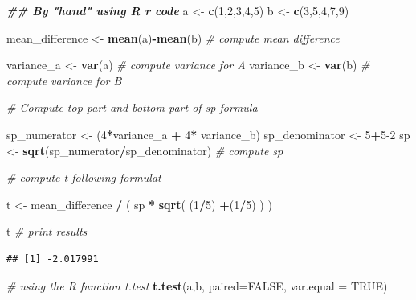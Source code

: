 \documentclass[
]{book}
\newenvironment{Shaded}{\begin{snugshade}}{\end{snugshade}}
\newcommand{\AttributeTok}[1]{\textcolor[rgb]{0.13,0.29,0.53}{#1}}
\newcommand{\CommentTok}[1]{\textcolor[rgb]{0.56,0.35,0.01}{\textit{#1}}}
\newcommand{\ConstantTok}[1]{\textcolor[rgb]{0.56,0.35,0.01}{#1}}
\newcommand{\DecValTok}[1]{\textcolor[rgb]{0.00,0.00,0.81}{#1}}
\newcommand{\DocumentationTok}[1]{\textcolor[rgb]{0.56,0.35,0.01}{\textbf{\textit{#1}}}}
\newcommand{\FunctionTok}[1]{\textcolor[rgb]{0.13,0.29,0.53}{\textbf{#1}}}
\newcommand{\NormalTok}[1]{#1}
\newcommand{\OtherTok}[1]{\textcolor[rgb]{0.56,0.35,0.01}{#1}}
\newcommand{\SpecialCharTok}[1]{\textcolor[rgb]{0.81,0.36,0.00}{\textbf{#1}}}
\begin{document}
\begin{Shaded}
\begin{Highlighting}[]
\DocumentationTok{\#\# By "hand" using R r code}
\NormalTok{a }\OtherTok{\textless{}{-}} \FunctionTok{c}\NormalTok{(}\DecValTok{1}\NormalTok{,}\DecValTok{2}\NormalTok{,}\DecValTok{3}\NormalTok{,}\DecValTok{4}\NormalTok{,}\DecValTok{5}\NormalTok{)}
\NormalTok{b }\OtherTok{\textless{}{-}} \FunctionTok{c}\NormalTok{(}\DecValTok{3}\NormalTok{,}\DecValTok{5}\NormalTok{,}\DecValTok{4}\NormalTok{,}\DecValTok{7}\NormalTok{,}\DecValTok{9}\NormalTok{)}

\NormalTok{mean\_difference }\OtherTok{\textless{}{-}} \FunctionTok{mean}\NormalTok{(a)}\SpecialCharTok{{-}}\FunctionTok{mean}\NormalTok{(b) }\CommentTok{\# compute mean difference}

\NormalTok{variance\_a }\OtherTok{\textless{}{-}} \FunctionTok{var}\NormalTok{(a) }\CommentTok{\# compute variance for A}
\NormalTok{variance\_b }\OtherTok{\textless{}{-}} \FunctionTok{var}\NormalTok{(b) }\CommentTok{\# compute variance for B}

\CommentTok{\# Compute top part and bottom part of sp formula}

\NormalTok{sp\_numerator }\OtherTok{\textless{}{-}}\NormalTok{ (}\DecValTok{4}\SpecialCharTok{*}\NormalTok{variance\_a }\SpecialCharTok{+} \DecValTok{4}\SpecialCharTok{*}\NormalTok{ variance\_b) }
\NormalTok{sp\_denominator }\OtherTok{\textless{}{-}} \DecValTok{5}\SpecialCharTok{+}\DecValTok{5{-}2}
\NormalTok{sp }\OtherTok{\textless{}{-}} \FunctionTok{sqrt}\NormalTok{(sp\_numerator}\SpecialCharTok{/}\NormalTok{sp\_denominator) }\CommentTok{\# compute sp}


\CommentTok{\# compute t following formulat}

\NormalTok{t }\OtherTok{\textless{}{-}}\NormalTok{ mean\_difference }\SpecialCharTok{/}\NormalTok{ ( sp }\SpecialCharTok{*} \FunctionTok{sqrt}\NormalTok{( (}\DecValTok{1}\SpecialCharTok{/}\DecValTok{5}\NormalTok{) }\SpecialCharTok{+}\NormalTok{(}\DecValTok{1}\SpecialCharTok{/}\DecValTok{5}\NormalTok{) ) )}

\NormalTok{t }\CommentTok{\# print results}
\end{Highlighting}
\end{Shaded}

\begin{verbatim}
## [1] -2.017991
\end{verbatim}

\begin{Shaded}
\begin{Highlighting}[]
\CommentTok{\# using the R function t.test}
\FunctionTok{t.test}\NormalTok{(a,b, }\AttributeTok{paired=}\ConstantTok{FALSE}\NormalTok{, }\AttributeTok{var.equal =} \ConstantTok{TRUE}\NormalTok{)}
\end{Highlighting}
\end{Shaded}
\end{document}
